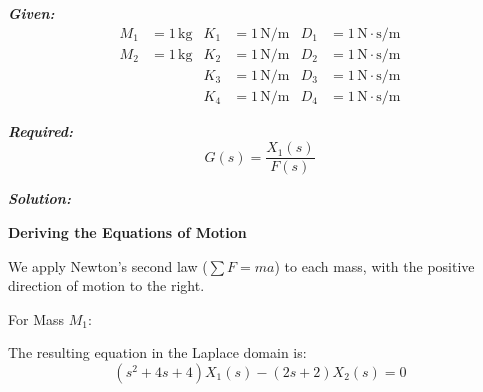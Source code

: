 \documentclass[11pt]{article}
\begin{document}
\vspace{12pt}

\noindent\textbf{\textit{Given:}}
\[
\begin{aligned}
M_1 &= 1\, \text{kg} & K_1 &= 1\, \text{N/m} & D_1 &= 1\, \text{N}\cdot\text{s/m} \\
M_2 &= 1\, \text{kg} & K_2 &= 1\, \text{N/m} & D_2 &= 1\, \text{N}\cdot\text{s/m} \\
& & K_3 &= 1\, \text{N/m} & D_3 &= 1\, \text{N}\cdot\text{s/m} \\
& & K_4 &= 1\, \text{N/m} & D_4 &= 1\, \text{N}\cdot\text{s/m}
\end{aligned}
\]

\vspace{12pt}

\noindent \textbf{\textit{Required:}}
\[
G(s) = \frac{X_1(s)}{F(s)}
\]

\vspace{12pt}

\noindent \textbf{\textit{Solution:}}

\vspace{12pt}

\noindent \textbf{Deriving the Equations of Motion}
\vspace{12pt}

\noindent We apply Newton's second law ($\sum F = ma$) to each mass, with the positive direction of motion to the right. 

\vspace{12pt}
{For Mass $M_1$:}
\begin{figure}[h!]
\centering
{}
\end{figure}

The resulting equation in the Laplace domain is:
\begin{equation}
(s^2 + 4s + 4)X_1(s) - (2s + 2)X_2(s) = 0 \tag{1}
\end{equation}
\end{document}
